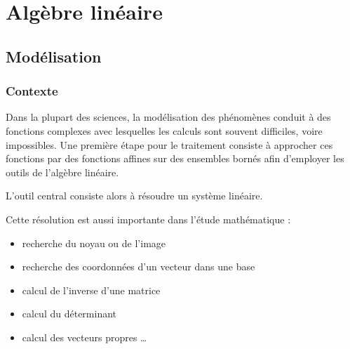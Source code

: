 \chapter{Algèbre linéaire}
\thispagestyle{empty}
\section{Modélisation}
\subsection{Contexte}
Dans la plupart des sciences, la modélisation des phénomènes conduit à des fonctions complexes avec lesquelles les calculs sont souvent difficiles, voire impossibles. Une première étape pour le traitement consiste à approcher ces fonctions par des fonctions affines sur des ensembles bornés afin d'employer les outils de l'algèbre linéaire. 

L'outil central consiste alors à résoudre un système linéaire.

\medskip

Cette résolution est aussi importante dans l'étude mathématique :

\begin{itemize}
\item recherche du noyau ou de l'image
\item recherche des coordonnées d'un vecteur dans une base
\item calcul de l'inverse d'une matrice
\item calcul du déterminant
\item calcul des vecteurs propres \dots
\end{itemize}
